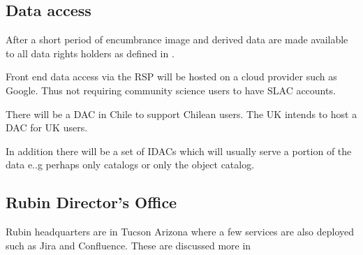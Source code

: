 \subsection{Data access}
After a short period of encumbrance image and derived data are made available to all
data rights holders as defined in .

Front end data access via the \gls{RSP} will be hosted on a cloud provider such as Google.
Thus not requiring community science users to have SLAC accounts.

There will  be a \gls{DAC} in Chile to support Chilean users. The UK intends to host a DAC for UK users.

In addition there will be a set of \gls{IDAC}s which will usually serve a portion of the data e..g perhaps only catalogs or only the object catalog.


\subsection{Rubin Director's Office}
Rubin headquarters are in Tucson Arizona where a few services are also deployed such as Jira and Confluence.
These are discussed more in 

